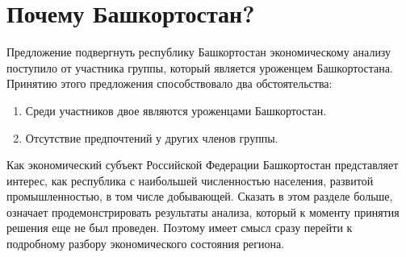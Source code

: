 \section{Почему Башкортостан?}

Предложение подвергнуть республику Башкортостан экономическому анализу поступило от участника группы, 
который является уроженцем Башкортостана. Принятию этого предложения способствовало два обстоятельства:
\begin{enumerate}
	\item Среди участников двое являются уроженцами Башкортостан.
	\item Отсутствие предпочтений у других членов группы.
\end{enumerate}
Как экономический субъект Российской Федерации Башкортостан представляет интерес, как республика с наибольшей численностью населения, развитой промышленностью, в том числе добывающей.
Сказать в этом разделе больше, означает продемонстрировать результаты анализа, который к моменту принятия решения еще не был проведен.  
Поэтому имеет смысл сразу перейти к подробному разбору экономического состояния региона.